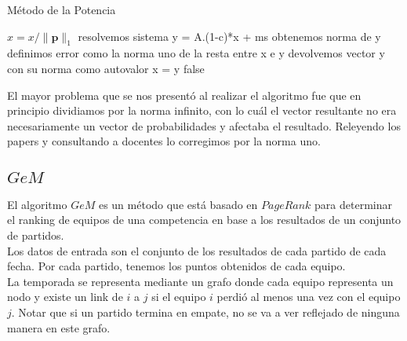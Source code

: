 \begin{algorithm}
\caption{Método de la Potencia}\label{metpot}
\begin{algorithmic}[1]


    \State $x = x/\lVert \mathbf{p} \rVert _{1}$
	    \State resolvemos sistema y = A.(1-c)*x + ms
 	    \State obtenemos norma de y
 	    \State 	definimos error como la norma uno de la resta entre x e y
      	\State devolvemos vector y con su norma como autovalor
      \Else
        \State x = y
      \EndIf
    \EndWhile
    \Return false
  \EndFunction

\end{algorithmic}
\end{algorithm}


El mayor problema que se nos presentó al realizar el algoritmo fue que en principio dividiamos por la norma infinito, con lo cuál el vector resultante no era necesariamente un vector de probabilidades y afectaba el resultado. Releyendo los papers y consultando a docentes lo corregimos por la norma uno.\\

\subsection{$GeM$}

El algoritmo $GeM$ es un método que está basado en $PageRank$ para determinar el ranking de equipos de una competencia en base a los resultados de un conjunto de partidos.\\

Los datos de entrada son el conjunto de los resultados de cada partido de cada fecha. Por cada partido, tenemos los puntos obtenidos de cada equipo.\\

La temporada se representa mediante un grafo donde cada equipo representa un nodo y existe un link de $i$ a $j$ si el equipo $i$ perdi\'o al
menos una vez con el equipo $j$. Notar que si un partido termina en empate, no se va a ver reflejado de ninguna manera en este grafo.


